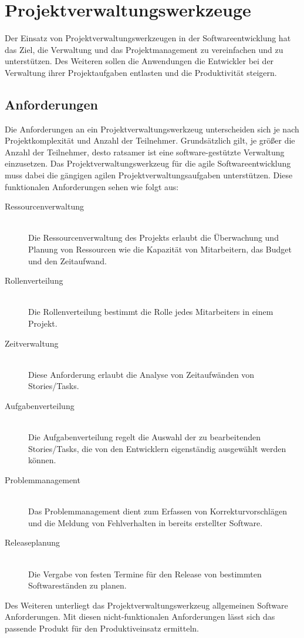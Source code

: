 \section{Projektverwaltungswerkzeuge}
Der Einsatz von Projektverwaltungswerkzeugen in der Softwareentwicklung hat das Ziel, die Verwaltung und das Projektmanagement zu vereinfachen und zu unterstützen. Des Weiteren sollen die Anwendungen die Entwickler bei der Verwaltung ihrer Projektaufgaben entlasten und die Produktivität steigern.\\

\subsection{Anforderungen}\label{ssec:anforderungen}
Die Anforderungen an ein Projektverwaltungswerkzeug unterscheiden sich je nach Projektkomplexität und Anzahl der Teilnehmer. Grundsätzlich gilt, je größer die Anzahl der Teilnehmer, desto ratsamer ist eine software-gestützte Verwaltung einzusetzen.
Das Projektverwaltungswerkzeug für die agile Softwareentwicklung muss dabei die gängigen agilen Projektverwaltungsaufgaben unterstützen. Diese funktionalen Anforderungen sehen wie folgt aus:

\begin{description}
	\item[Ressourcenverwaltung]\hspace*{1em}\\
Die Ressourcenverwaltung des Projekts erlaubt die Überwachung und Planung von Ressourcen wie die Kapazität von Mitarbeitern, das Budget und den Zeitaufwand.
	\item[Rollenverteilung]\hspace*{1em}\\
Die Rollenverteilung bestimmt die Rolle jedes Mitarbeiters in einem Projekt.
	\item[Zeitverwaltung]\hspace*{1em}\\
Diese Anforderung erlaubt die Analyse von Zeitaufwänden von Stories/Tasks.
	\item[Aufgabenverteilung]\hspace*{1em}\\
Die Aufgabenverteilung regelt die Auswahl der zu bearbeitenden Stories/Tasks, die von den Entwicklern eigenständig ausgewählt werden können.
	\item[Problemmanagement]\hspace*{1em}\\
Das Problemmanagement dient zum Erfassen von Korrekturvorschlägen und die Meldung von Fehlverhalten in bereits erstellter Software. 
	\item[Releaseplanung]\hspace*{1em}\\
Die Vergabe von festen Termine für den Release von bestimmten Softwareständen zu planen.\\
\end{description}
Des Weiteren unterliegt das Projektverwaltungswerkzeug allgemeinen Software Anforderungen. Mit diesen nicht-funktionalen Anforderungen lässt sich das passende Produkt für den Produktiveinsatz ermitteln.

